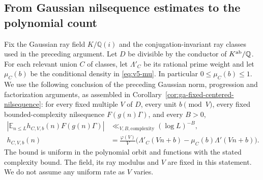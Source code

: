 \documentclass[11pt]{article}
\theoremstyle{definition}
\theoremstyle{remark}
\newcommand{\Q}{\mathbb Q}
\begin{document}
\subsection{From Gaussian nilsequence estimates to the polynomial count}
\label{subsec:gaussian-gowers-bridge}

Fix the Gaussian ray field $K/\Q(i)$ and the conjugation-invariant ray
classes used in the preceding argument. Let $D$ be divisible by the
conductor of $K^{\rm ab}/\Q$. For each relevant union $C$ of classes,
let $\Lambda'_C$ be its rational prime weight and let $\mu_C(b)$ be the
conditional density in \eqref{eq:v5-mu}. In particular
$0\leq\mu_C(b)\leq1$. We use the following conclusion of the preceding
Gaussian norm, progression and factorization arguments, as assembled in
Corollary~\ref{cor:ga-fixed-centered-nilsequence}: for every fixed
multiple $V$ of $D$, every unit $b\pmod V$, every fixed bounded-complexity
nilsequence $F(g(n)\Gamma)$, and every $B>0$,
\begin{equation}\label{eq:gaussian-centered-nil-input}
\begin{aligned}
 \left|\mathbb E_{n\leq L}h_{C,V,b}(n)F(g(n)\Gamma)\right|
 &\ll_{V,B,\mathrm{complexity}}(\log L)^{-B},\\
 h_{C,V,b}(n)&=\frac{\varphi(V)}V
 \bigl(\Lambda'_C(Vn+b)-\mu_C(b)\Lambda'(Vn+b)\bigr).
\end{aligned}
\end{equation}
The bound is uniform in the polynomial orbit and functions with the stated
complexity bound. The field, its ray modulus and $V$ are fixed in this
statement. We do not assume any uniform rate as $V$ varies.
\end{document}
